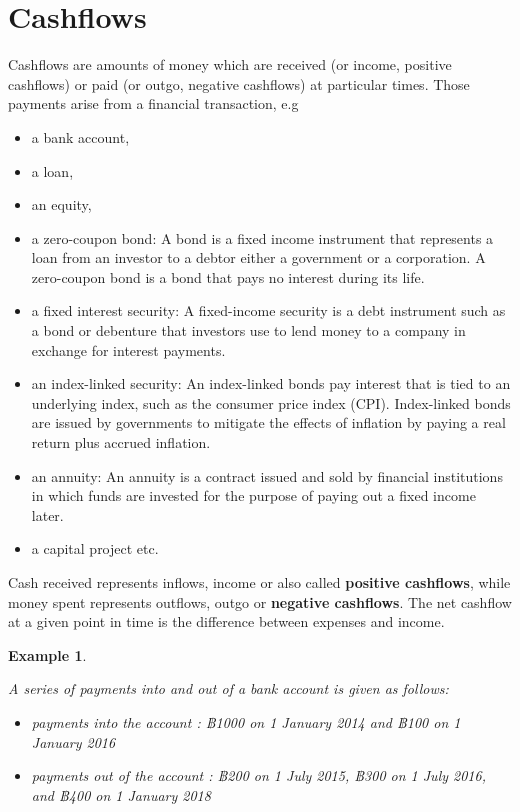 \documentclass[landscape, 20pt]{extreport}
\theoremstyle{definition}
\theoremstyle{definition}
\newtheorem{example}{Example}[chapter]
\theoremstyle{definition}
\theoremstyle{definition}
\theoremstyle{remark}
\begin{document}
\hypertarget{cashflows}{%
\section{Cashflows}\label{cashflows}}

Cashflows are amounts of money which are received (or income, positive
cashflows) or paid (or outgo, negative cashflows) at particular times.
Those payments arise from a financial transaction, e.g

\begin{itemize}
\item
  a bank account,
\item
  a loan,
\item
  an equity,
\item
  a zero-coupon bond: A bond is a fixed income instrument that
  represents a loan from an investor to a debtor either a government
  or a corporation. A zero-coupon bond is a bond that pays no interest
  during its life.
\item
  a fixed interest security: A fixed-income security is a debt
  instrument such as a bond or debenture that investors use to lend
  money to a company in exchange for interest payments.
\item
  an index-linked security: An index-linked bonds pay interest that is
  tied to an underlying index, such as the consumer price index (CPI).
  Index-linked bonds are issued by governments to mitigate the effects
  of inflation by paying a real return plus accrued inflation.
\item
  an annuity: An annuity is a contract issued and sold by financial
  institutions in which funds are invested for the purpose of paying
  out a fixed income later.
\item
  a capital project etc.
\end{itemize}

Cash received represents inflows, income or also called \textbf{positive
cashflows}, while money spent represents outflows, outgo or \textbf{negative
cashflows}. The net cashflow at a given point in time is the difference
between expenses and income.

\newpage \begin{example}
\protect\hypertarget{exm:unlabeled-div-1}{}\label{exm:unlabeled-div-1}

\emph{A series of payments into and out of a bank account is
given as follows:}

\begin{itemize}
\item
  \emph{payments into the account : ฿1000 on 1 January 2014 and ฿100 on 1
  January 2016}
\item
  \emph{payments out of the account : ฿200 on 1 July 2015, ฿300 on 1 July
  2016, and ฿400 on 1 January 2018}
\end{itemize}

\end{example}
\end{document}
